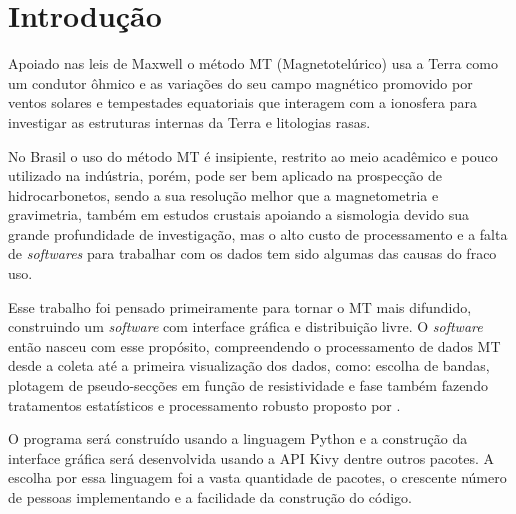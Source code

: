 

\chapter{Introdução}
    \label{cap-introducao}
    
	Apoiado nas leis de Maxwell o método MT (Magnetotelúrico) usa a Terra como 
	um condutor ôhmico e as variações do seu campo 
	magnético promovido por ventos solares \cite{parkinson93} e tempestades equatoriais 
	que interagem com a ionosfera para investigar as 
	estruturas internas da Terra e litologias rasas. 
	
	
	No Brasil o uso do método MT é insipiente, restrito ao meio acadêmico e pouco
	utilizado na indústria, porém, pode ser bem aplicado na prospecção de 
	hidrocarbonetos, sendo a sua resolução melhor que a magnetometria
	e gravimetria, também em estudos crustais
	apoiando a sismologia devido sua grande profundidade de investigação, mas o 
	alto custo de processamento e a falta de \textit{softwares} para trabalhar com os 
	dados tem sido algumas das causas do fraco uso.
	
	
	Esse trabalho foi pensado primeiramente para tornar o MT mais difundido, 
	construindo um \textit{software} com interface gráfica e 
	distribuição livre. O \textit{software} então nasceu 
	com esse propósito, compreendendo o processamento de dados
	MT desde a coleta até a primeira visualização dos dados, como: escolha 
	de bandas, plotagem de pseudo-secções em função de resistividade e fase 
	também fazendo tratamentos estatísticos e processamento robusto 
	proposto por \citeauthor{egbert97} \citeyearpar{egbert97}.
	
	
	O programa será construído usando a linguagem Python \cite{python36} 
	e a construção da interface gráfica será desenvolvida usando a API
	Kivy \cite{kivy110} dentre outros pacotes. A escolha por essa linguagem foi a vasta quantidade de pacotes,  o crescente 
	número de pessoas implementando e a facilidade da construção do código.



